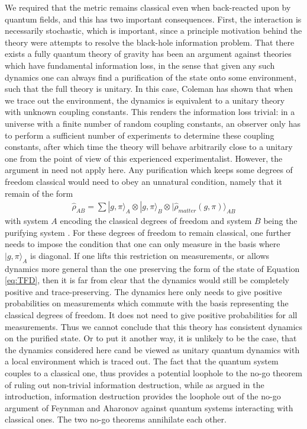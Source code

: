 \documentclass[aps,pra,showpacs,citeautoscript,amsmath,amssymb,floatfix,superscriptaddress,bbm, verbatim,amsfonts,changes,10pt,nofootinbib,longbibliography]{revtex4-1}
\newcommand{\ket}[1]{|#1\rangle}
\renewcommand{\varrho}{\hat{\rho}}
\begin{document}
We required that\label{par:require} the metric remains classical even when back-reacted upon by quantum fields, and this has two important consequences. First, the interaction is necessarily stochastic, which is important, since a principle motivation behind the theory were attempts to resolve the black-hole information problem.
That there exists a fully quantum theory of gravity has been an argument against theories which have fundamental information loss, in the sense that given any such dynamics one can always find a purification of the state onto some environment, such that the full theory is unitary. 
In this case,  Coleman has shown that when we trace out the environment, the dynamics is equivalent to a unitary theory with unknown coupling constants\cite{coleman1988black}. 
This renders the information loss trivial: in a universe with a finite number of random coupling constants, an observer only has to perform a sufficient number of experiments to determine these coupling constants, after which time the theory will behave arbitrarily close to a unitary one from the  point of view of this experienced experimentalist.\label{par:coleman} However, the argument in \cite{coleman1988black} need not apply here. Any purification which keeps some degrees of freedom classical would need to obey an unnatural condition, namely that it remain of the form
\begin{align}
\varrho_{AB}=\sum
\ket{g,\pi}_A
\otimes\ket{g,\pi}_B
\otimes\ket{\varrho_{matter}(g,\pi)}_{AB}
\label{eq:TFD}
\end{align}
with system $A$ encoding the
classical degrees of freedom and system $B$ being the purifying system
\cite{TFD_foot}. For these degrees of freedom to remain classical, one further needs to impose the condition that one can only measure in the basis where $\ket{g,\pi}_A$ is diagonal. If one lifts this restriction on measurements, or allows dynamics more general than the one preserving the form of the state of Equation \eqref{eq:TFD}, then it is far from clear that the dynamics would still be completely positive and trace-preserving. The dynamics here only needs to give positive probabilities on measurements which commute with the basis representing the classical degrees of freedom. It does not need to give positive probabilities for all measurements. Thus we cannot conclude that this theory has consistent dynamics on the purified state. Or to put it another way, it is unlikely to be the case, that the dynamics considered here cand be viewed as unitary quantum dynamics with a local environment which is traced out. The fact that the quantum system couples to a classical one, thus provides a potential loophole to the no-go theorem of \cite{coleman1988black} ruling out non-trivial information destruction, while as argued in the introduction, information destruction provides the loophole out of the no-go argument of Feynman and Aharonov against quantum systems interacting with classical ones. The two no-go theorems annihilate each other.
\end{document}
